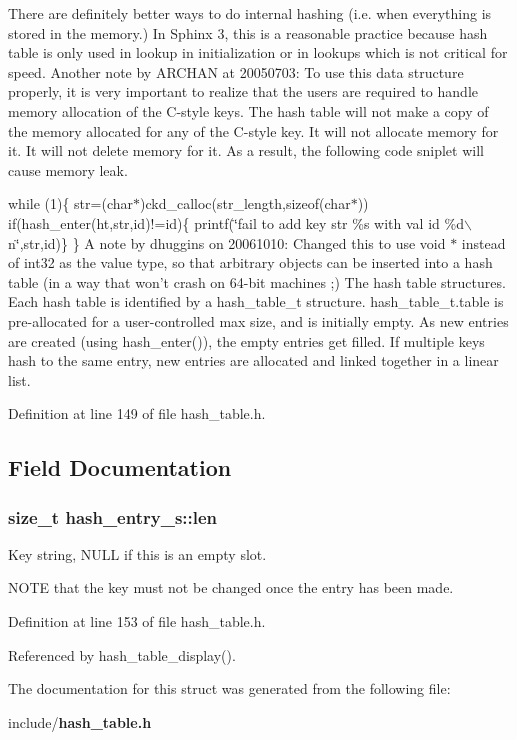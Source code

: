 There are definitely better ways to do internal hashing (i.e. when everything is stored in the memory.) In Sphinx 3, this is a reasonable practice because hash table is only used in lookup in initialization or in lookups which is not critical for speed. Another note by ARCHAN at 20050703: To use this data structure properly, it is very important to realize that the users are required to handle memory allocation of the C-style keys. The hash table will not make a copy of the memory allocated for any of the C-style key. It will not allocate memory for it. It will not delete memory for it. As a result, the following code sniplet will cause memory leak.

while (1)\{ str=(char$\ast$)ckd\_\-calloc(str\_\-length,sizeof(char$\ast$)) if(hash\_\-enter(ht,str,id)!=id)\{ printf(\char`\"{}fail to add key str \%s with val id \%d$\backslash$n\char`\"{},str,id)\} \} A note by dhuggins on 20061010: Changed this to use void $\ast$ instead of int32 as the value type, so that arbitrary objects can be inserted into a hash table (in a way that won't crash on 64-bit machines ;) The hash table structures. Each hash table is identified by a hash\_\-table\_\-t structure. hash\_\-table\_\-t.table is pre-allocated for a user-controlled max size, and is initially empty. As new entries are created (using hash\_\-enter()), the empty entries get filled. If multiple keys hash to the same entry, new entries are allocated and linked together in a linear list. 

Definition at line 149 of file hash\_\-table.h.

\subsection{Field Documentation}
\subsubsection[{len}]{\setlength{\rightskip}{0pt plus 5cm}size\_\-t {\bf hash\_\-entry\_\-s::len}}\label{structhash__entry__s_f1ec5f16059ced6d9a8ae4d36ca7e2b3}


Key string, NULL if this is an empty slot. 

NOTE that the key must not be changed once the entry has been made. 

Definition at line 153 of file hash\_\-table.h.

Referenced by hash\_\-table\_\-display().

The documentation for this struct was generated from the following file:\begin{CompactItemize}
\item 
include/{\bf hash\_\-table.h}\end{CompactItemize}
